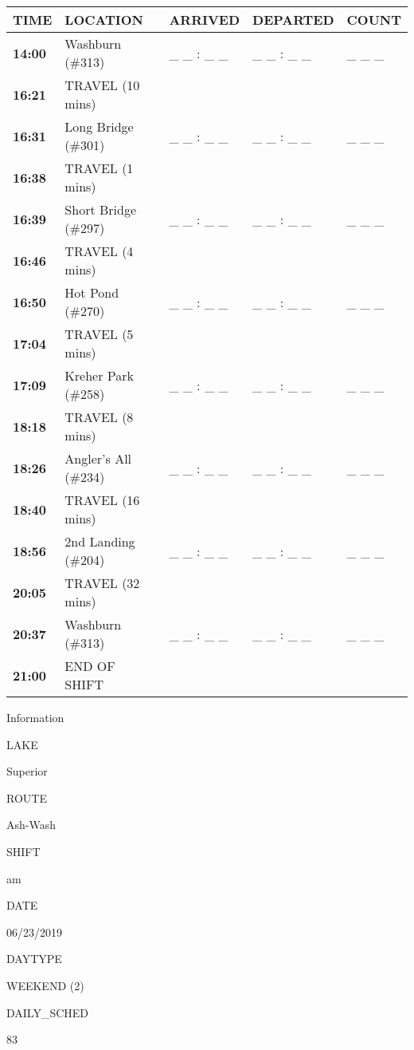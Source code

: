 \documentclass[]{article}
\begin{document}
\begin{tabular}{>{\bfseries}lllll}
\toprule
\textbf{TIME} & \textbf{LOCATION} & \textbf{ARRIVED} & \textbf{DEPARTED} & \textbf{COUNT}\\
\midrule
14:00 & Washburn (\#313) & \_ \_ : \_ \_ & \_ \_ : \_ \_ & \_ \_ \_\\
16:21 & TRAVEL (10 mins) &  &  & \\
16:31 & Long Bridge (\#301) & \_ \_ : \_ \_ & \_ \_ : \_ \_ & \_ \_ \_\\
16:38 & TRAVEL (1 mins) &  &  & \\
16:39 & Short Bridge (\#297) & \_ \_ : \_ \_ & \_ \_ : \_ \_ & \_ \_ \_\\
16:46 & TRAVEL (4 mins) &  &  & \\
16:50 & Hot Pond (\#270) & \_ \_ : \_ \_ & \_ \_ : \_ \_ & \_ \_ \_\\
17:04 & TRAVEL (5 mins) &  &  & \\
17:09 & Kreher Park (\#258) & \_ \_ : \_ \_ & \_ \_ : \_ \_ & \_ \_ \_\\
18:18 & TRAVEL (8 mins) &  &  & \\
18:26 & Angler's All (\#234) & \_ \_ : \_ \_ & \_ \_ : \_ \_ & \_ \_ \_\\
18:40 & TRAVEL (16 mins) &  &  & \\
18:56 & 2nd Landing (\#204) & \_ \_ : \_ \_ & \_ \_ : \_ \_ & \_ \_ \_\\
20:05 & TRAVEL (32 mins) &  &  & \\
20:37 & Washburn (\#313) & \_ \_ : \_ \_ & \_ \_ : \_ \_ & \_ \_ \_\\
21:00 & END OF SHIFT &  &  & \\
\bottomrule
\end{tabular}\newpage

Information

LAKE

Superior

ROUTE

Ash-Wash

SHIFT

am

DATE

06/23/2019

DAYTYPE

WEEKEND (2)

DAILY\_SCHED

83

\vspace{24pt}
\end{document}
